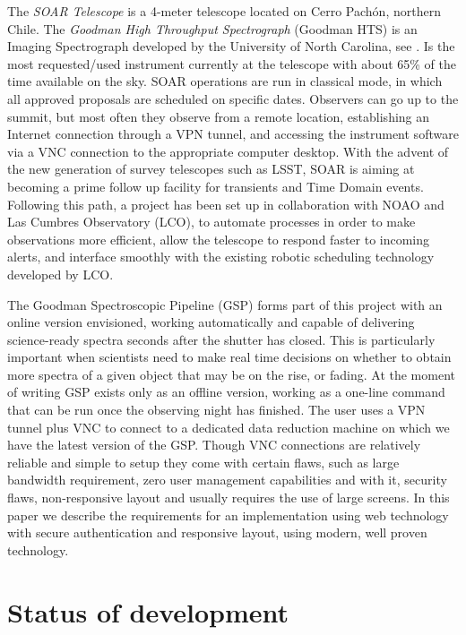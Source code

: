 \documentclass[11pt,twoside]{article}
\begin{document}
The \emph{SOAR Telescope} is a 4-meter telescope located on Cerro Pach\'on, northern Chile. The \emph{Goodman High Throughput Spectrograph} (Goodman HTS) is an Imaging Spectrograph developed by the University of North Carolina, see \citet{2004SPIE.5492..331C}. Is the most requested/used instrument currently at the telescope with about 65\% of the time available on the sky. SOAR operations are run in classical mode, in which all approved proposals are scheduled on specific dates. Observers can go up to the summit, but most often they observe from a remote location, establishing an Internet connection through a VPN tunnel, and accessing the instrument software via a VNC connection to the appropriate computer desktop. With the advent of the new generation of survey telescopes such as LSST, SOAR is aiming at becoming a prime follow up facility for transients and Time Domain events. Following this path, a project has been set up in collaboration with NOAO and Las Cumbres Observatory (LCO), to automate processes in order to make observations more efficient, allow the telescope to respond faster to incoming alerts, and interface smoothly with the existing robotic scheduling technology developed by LCO. 

The Goodman Spectroscopic Pipeline (GSP) forms part of this project with an online version envisioned, working automatically and capable of delivering science-ready spectra seconds after the shutter has closed. This is particularly important when scientists need to make real time decisions on whether to obtain more spectra of a given  object that may be on the rise, or fading. At the moment of writing GSP exists only as an offline version, working as a one-line command that can be run once the observing night has finished. The user uses a VPN tunnel plus VNC to connect to a dedicated data reduction machine on which we have the latest version of the GSP. Though VNC connections are relatively reliable and simple to setup they come with certain flaws, such as large bandwidth requirement, zero user management capabilities and with it, security flaws, non-responsive layout and usually requires the use of large screens. In this paper we describe the requirements for an implementation using web technology with secure authentication and responsive layout, using modern, well proven technology.

\section{Status of development}
\end{document}
